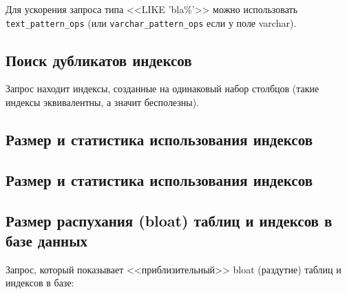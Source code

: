 Для ускорения запроса типа <<LIKE 'bla\%'>> можно использовать \lstinline!text_pattern_ops! (или \lstinline!varchar_pattern_ops! если у поле varchar).



\subsection{Поиск дубликатов индексов}
Запрос находит индексы, созданные на одинаковый набор столбцов (такие индексы эквивалентны, а значит бесполезны).



\subsection{Размер и статистика использования индексов}



\subsection{Размер и статистика использования индексов}



\subsection{Размер распухания (bloat) таблиц и индексов в базе данных}
\label{sec:snippets-bloating}

Запрос, который показывает <<приблизительный>> bloat (раздутие) таблиц и индексов в базе:


